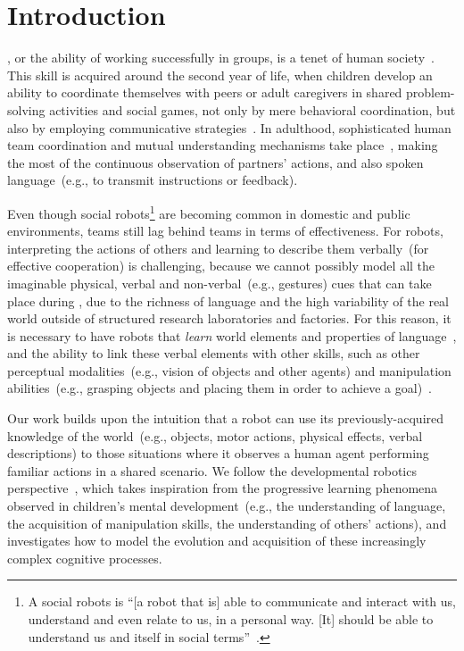 
\section{Introduction}
\label{sec:intro}

, or the ability of working successfully in groups, is a tenet of human society~\cite{turner:1975}.
This skill is acquired around the second year of life, when children develop an ability to coordinate themselves with peers or adult caregivers in shared problem-solving activities and social games, not only by mere behavioral coordination, but also by employing communicative strategies~\cite{melis:2010:rstb}.
In adulthood, sophisticated human team coordination and mutual understanding mechanisms take place~\cite{ramnani:2004:natureneuro}, making the most of the continuous observation of partners' actions, and also spoken language~(e.g., to transmit instructions or feedback).

Even though social robots\footnote{A social robots is ``[a robot that is] able to communicate and interact with us, understand and even relate to us, in a personal way. [It] should be able to understand us and itself in social terms''~\cite{breazeal:2002:dsr}.} are becoming common in domestic and public environments, \hr{} teams still lag behind \hh{} teams in terms of effectiveness.
For robots, interpreting the actions of others and learning to describe them verbally~(for effective cooperation) is challenging, because we cannot possibly model all the imaginable physical, verbal and non-verbal~(e.g., gestures) cues that can take place during \hri, due to the richness of language and the high variability of the real world outside of structured research laboratories and factories.
For this reason, it is necessary to have robots that \emph{learn} world elements and properties of language~\cite{iwahashi:2007:hri}, and the ability to link these verbal elements with other skills, such as other perceptual modalities~(e.g., vision of objects and other agents) and manipulation abilities~(e.g., grasping objects and placing them in order to achieve a goal)~\cite{steels:2003:trendscogsci}.

Our work builds upon the intuition that a robot can use its previously-acquired knowledge of the world~(e.g., objects, motor actions, physical effects, verbal descriptions) to those situations where it observes a human agent performing familiar actions in a shared \hr{} scenario.
We follow the developmental robotics perspective~\cite{lungarella:2003:devrobsurvey,cangelosi:2015:devrobbook},
which takes inspiration from the progressive learning phenomena observed in children's mental development~(e.g., the understanding of language, the acquisition of manipulation skills, the understanding of others' actions), and investigates how to model the evolution and acquisition of these increasingly complex cognitive processes.

